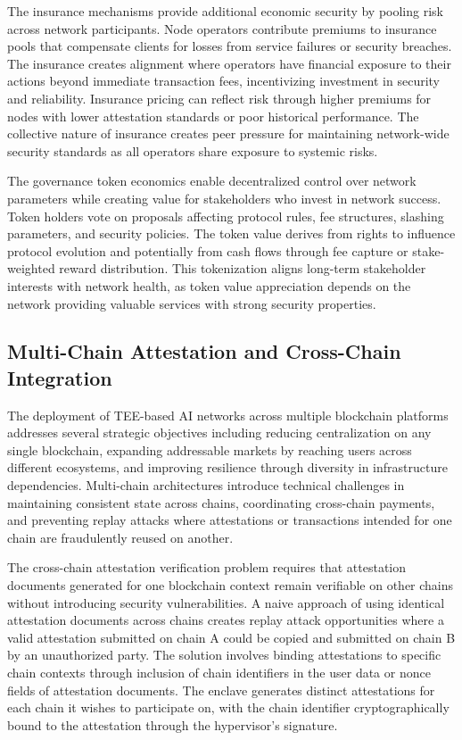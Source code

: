 The insurance mechanisms provide additional economic security by pooling risk across network participants. Node operators contribute premiums to insurance pools that compensate clients for losses from service failures or security breaches. The insurance creates alignment where operators have financial exposure to their actions beyond immediate transaction fees, incentivizing investment in security and reliability. Insurance pricing can reflect risk through higher premiums for nodes with lower attestation standards or poor historical performance. The collective nature of insurance creates peer pressure for maintaining network-wide security standards as all operators share exposure to systemic risks.

The governance token economics enable decentralized control over network parameters while creating value for stakeholders who invest in network success. Token holders vote on proposals affecting protocol rules, fee structures, slashing parameters, and security policies. The token value derives from rights to influence protocol evolution and potentially from cash flows through fee capture or stake-weighted reward distribution. This tokenization aligns long-term stakeholder interests with network health, as token value appreciation depends on the network providing valuable services with strong security properties.

\subsection{Multi-Chain Attestation and Cross-Chain Integration}

The deployment of TEE-based AI networks across multiple blockchain platforms addresses several strategic objectives including reducing centralization on any single blockchain, expanding addressable markets by reaching users across different ecosystems, and improving resilience through diversity in infrastructure dependencies. Multi-chain architectures introduce technical challenges in maintaining consistent state across chains, coordinating cross-chain payments, and preventing replay attacks where attestations or transactions intended for one chain are fraudulently reused on another.

The cross-chain attestation verification problem requires that attestation documents generated for one blockchain context remain verifiable on other chains without introducing security vulnerabilities. A naive approach of using identical attestation documents across chains creates replay attack opportunities where a valid attestation submitted on chain A could be copied and submitted on chain B by an unauthorized party. The solution involves binding attestations to specific chain contexts through inclusion of chain identifiers in the user data or nonce fields of attestation documents. The enclave generates distinct attestations for each chain it wishes to participate on, with the chain identifier cryptographically bound to the attestation through the hypervisor's signature.

